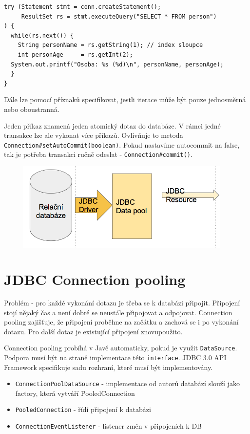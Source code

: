 \documentclass{szzclass}
\begin{document}
\begin{verbatim}
try (Statement stmt = conn.createStatement();
     ResultSet rs = stmt.executeQuery("SELECT * FROM person")
) {
  while(rs.next()) {
    String personName = rs.getString(1); // index sloupce
    int personAge     = rs.getInt(2);
  System.out.printf("Osoba: %s (%d)\n", personName, personAge);
  }
}
\end{verbatim}

Dále lze pomocí příznaků specifikovat, jestli iterace může být pouze jednosměrná nebo oboustranná.

Jeden příkaz znamená jeden atomický dotaz do databáze. V rámci jedné transakce lze ale vykonat více příkazů. Ovlivňuje to metoda \texttt{Connection#setAutoCommit(boolean)}. Pokud nastavíme autocommit na false, tak je potřeba transakci ručně odeslat - \texttt{Connection#commit()}.

\begin{figure}[h!]
\includegraphics[width=0.95\textwidth]{topics/bi-wsi-si-28/images/image2.png}
\end{figure}

\section{JDBC Connection pooling}
Problém - pro každé vykonání dotazu je třeba se k databázi připojit. Připojení stojí nějaký čas a není dobré se neustále připojovat a odpojovat. Connection pooling zajišťuje, že připojení proběhne na začátku a zachová se i po vykonání dotazu. Pro další dotaz je existující připojení znovupoužito.

Connection pooling probíhá v Javě automaticky, pokud je využit \texttt{DataSource}. Podpora musí být na straně implementace této \texttt{interface}. JDBC 3.0 API Framework specifikuje sadu rozhraní, které musí být implementovány.
\begin{itemize}
\item \texttt{ConnectionPoolDataSource} - implementace od autorů databází slouží jako factory, která vytváří PooledConnection
\item \texttt{PooledConnection} - řídí připojení k databázi
\item \texttt{ConnectionEventListener} - listener změn v připojeních k DB
\end{itemize}
\end{document}
